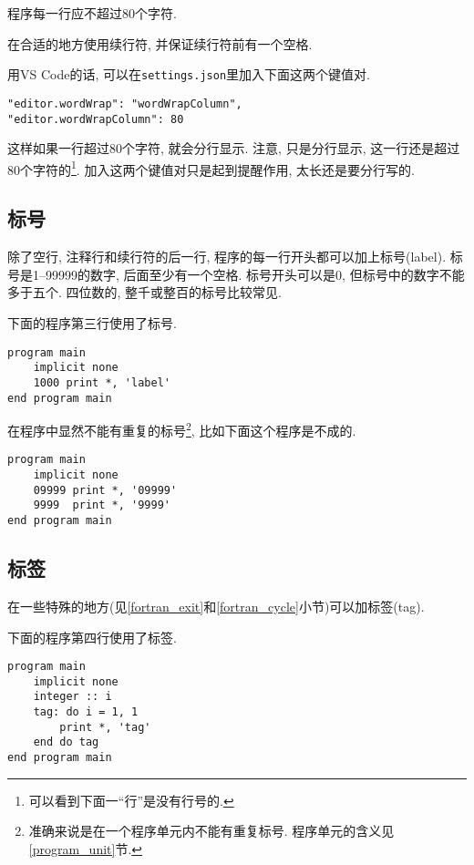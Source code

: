 \begin{convention}\label{fortran_no_more_than_80}
    程序每一行应不超过$80$个字符.
\end{convention}

\begin{convention}
    在合适的地方使用续行符, 并保证续行符前有一个空格.
\end{convention}

用VS Code的话, 可以在\texttt{settings.json}里加入下面这两个键值对.
\begin{lstlisting}
"editor.wordWrap": "wordWrapColumn",
"editor.wordWrapColumn": 80
\end{lstlisting}
这样如果一行超过80个字符, 就会分行显示. 注意, 只是分行显示, 这一行还是超过80个字符的\footnote{
    可以看到下面一``行''是没有行号的.
}. 加入这两个键值对只是起到提醒作用, 太长还是要分行写的.

\subsection{标号}

除了空行, 注释行和续行符的后一行, 程序的每一行开头都可以加上标号(label). 标号是1--99999的数字, 后面至少有一个空格. 标号开头可以是0, 但标号中的数字不能多于五个. 四位数的, 整千或整百的标号比较常见.

下面的程序第三行使用了标号.
\begin{lstlisting}
program main
    implicit none
    1000 print *, 'label'
end program main
\end{lstlisting}

在程序中显然不能有重复的标号\footnote{
    准确来说是在一个程序单元内不能有重复标号. 程序单元的含义见\ref{program_unit}节.
}, 比如下面这个程序是不成的.\begin{lstlisting}
program main
    implicit none
    09999 print *, '09999'
    9999  print *, '9999'
end program main
\end{lstlisting}

\subsection{标签}

在一些特殊的地方(见\ref{fortran_exit}和\ref{fortran_cycle}小节)可以加标签(tag). 

下面的程序第四行使用了标签.
\begin{lstlisting}
program main
    implicit none
    integer :: i
    tag: do i = 1, 1
        print *, 'tag'
    end do tag
end program main
\end{lstlisting}

